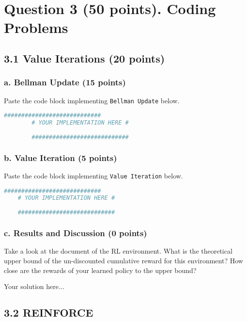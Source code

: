 \documentclass[12pt]{article}
\begin{document}
\section*{Question 3 (50 points). Coding Problems}

\subsection*{3.1 Value Iterations (20 points)}
\subsubsection*{a. Bellman Update (15 points)}
Paste the code block implementing \texttt{Bellman Update} below.
            \begin{solution}
                \begin{lstlisting}[language=Python]
		############################
		# YOUR IMPLEMENTATION HERE #
	
		############################
                \end{lstlisting}
            \end{solution}
 
\subsubsection*{b. Value Iteration (5 points)}
Paste the code block implementing \texttt{Value Iteration} below.
            \begin{solution}
                \begin{lstlisting}[language=Python]
    ############################
    # YOUR IMPLEMENTATION HERE #
    
    ############################
                \end{lstlisting}
            \end{solution}

\subsubsection*{c. Results and Discussion (0 points)}
Take a look at the document of the RL environment. What is the theoretical upper bound of the un-discounted cumulative reward for this environment? How close are the rewards of your learned policy to the upper bound?
\begin{solution}
    Your solution here...
\end{solution}

\subsection*{3.2 REINFORCE}
\end{document}
